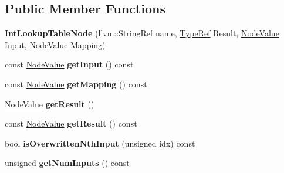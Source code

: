 \subsection*{Public Member Functions}
\begin{DoxyCompactItemize}
\item 
\mbox{\label{classglow_1_1_int_lookup_table_node_a8b0c74cd013254e5bc48addc716d36f6}} 
{\bfseries Int\+Lookup\+Table\+Node} (llvm\+::\+String\+Ref name, \hyperlink{structglow_1_1_type}{Type\+Ref} Result, \hyperlink{structglow_1_1_node_value}{Node\+Value} Input, \hyperlink{structglow_1_1_node_value}{Node\+Value} Mapping)
\item 
\mbox{\label{classglow_1_1_int_lookup_table_node_a2c49b83a98cb680090bcb26c53f30a4e}} 
const \hyperlink{structglow_1_1_node_value}{Node\+Value} {\bfseries get\+Input} () const
\item 
\mbox{\label{classglow_1_1_int_lookup_table_node_a703c506385dd42ac9754ea14d0eea310}} 
const \hyperlink{structglow_1_1_node_value}{Node\+Value} {\bfseries get\+Mapping} () const
\item 
\mbox{\label{classglow_1_1_int_lookup_table_node_a72df6256183bcc25bbc7971498fbf103}} 
\hyperlink{structglow_1_1_node_value}{Node\+Value} {\bfseries get\+Result} ()
\item 
\mbox{\label{classglow_1_1_int_lookup_table_node_ab80d8cad2e80765c9040d6ffe6af3ce3}} 
const \hyperlink{structglow_1_1_node_value}{Node\+Value} {\bfseries get\+Result} () const
\item 
\mbox{\label{classglow_1_1_int_lookup_table_node_a335dfe6a986b1d5cf81ce8772cd192ec}} 
bool {\bfseries is\+Overwritten\+Nth\+Input} (unsigned idx) const
\item 
\mbox{\label{classglow_1_1_int_lookup_table_node_a21b4c20fe61a70da854f235b86bd43b2}} 
unsigned {\bfseries get\+Num\+Inputs} () const
\item 
\mbox{\label{classglow_1_1_int_lookup_table_node_a1478bec8c8800919e46d801bb8dd8349}} 

\end{DoxyCompactItemize}
